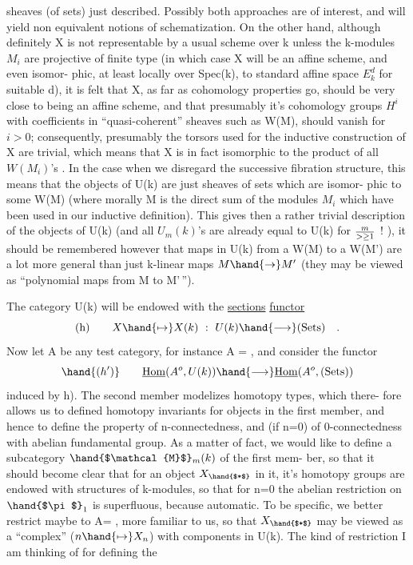 
sheaves  (of sets) just described.  Possibly both approaches are
of interest,  and will yield non equivalent notions of schematization.
On the other hand,  although definitely X is not representable by a
usual  scheme over k unless the k-modules $M_i$ are projective of
finite type (in which case X will be an affine scheme,  and even isomor-%
phic,  at least locally over Spec(k),  to standard affine space $E_k^d$ for
suitable  d),  it is felt that X,  as far as cohomology properties go,
should be very close to being an affine scheme,  and that presumably
it's cohomology groups $H^i$  with coefficients in ``quasi-coherent'' 
sheaves such as W(M),  should vanish for $i>0$;  consequently,  presumably
the torsors used for the inductive construction of X are trivial,  which
means that X is in fact isomorphic to the product of all $W(M_i)$'s .  In
the case when we disregard the successive fibration structure,  this
means that the objects of U(k) are just sheaves of sets which are isomor-%
phic to some W(M)  (where morally M is the direct sum of the modules $M_i$
which have been used in our inductive definition).  This gives then a
rather trivial description of the objects of U(k) (and all $U_m(k)$'s are
already equal to U(k)\hand{,} for $m \over{>}{\geq} 1$ ! ),  it should be remembered however 
that maps in U(k)  from a W(M) to a W(M')  are a lot more general than
just k-linear maps  $M \hand{\to} M'$  (they may be viewed as ``polynomial maps
from M to M'\,'').

The category U(k) will be endowed with the \uline{sections} \uline{functor}
\[ \text{(h)} \qquad X \hand{\mapsto} X(k) \ : \ U(k) \hand{\longrightarrow} \text{(Sets)} \quad . \]
Now let A be any test category,  for instance A = \hand{$\Delta$},  and consider
the functor
\[ \hand{(h')} \qquad \underline{\mathrm{Hom}}(A^{o},U(k)) \hand{\longrightarrow} \underline{\mathrm{Hom}}(A^{o},\text{(Sets)}) \]
induced by h).  The second member modelizes homotopy types,  which there-%
fore allows us to defined homotopy invariants for objects in the first
member,  and hence to define the property of n-connectedness,  and (if
n=0)  of 0-connectedness with abelian fundamental group.  As a matter of
fact,  we would like to define a subcategory $\hand{$\mathcal{M}$}_m(k)$   of the first mem-%
ber,  so that it should become clear that for an object $X_{\hand{$*$}}$  in it, it's
homotopy groups are endowed with structures of k-modules,  so that for
n=0  the abelian restriction on $\hand{$\pi$}_1$ is superfluous,  because automatic.
To be specific,  we better restrict maybe to A= \hand{$\Delta$},  more familiar to
us,  so that $X_{\hand{$*$}}$ may be viewed as a ``complex''  ($n \hand{\mapsto} X_n$)  with components
in U(k).  The kind of restriction I am thinking of for defining the

